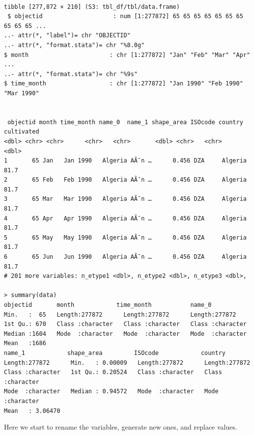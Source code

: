 \documentclass[12pt,letterpaper]{article}
\begin{document}
	
\begin{verbatim}

tibble [277,872 × 210] (S3: tbl_df/tbl/data.frame)
 $ objectid                    : num [1:277872] 65 65 65 65 65 65 65 65 65 65 ...
..- attr(*, "label")= chr "OBJECTID"
..- attr(*, "format.stata")= chr "%8.0g"
$ month                       : chr [1:277872] "Jan" "Feb" "Mar" "Apr" ...
..- attr(*, "format.stata")= chr "%9s"
$ time_month                  : chr [1:277872] "Jan 1990" "Feb 1990" "Mar 1990" 


 objectid month time_month name_0  name_1 shape_area ISOcode country cultivated
<dbl> <chr> <chr>      <chr>   <chr>       <dbl> <chr>   <chr>        <dbl>
1       65 Jan   Jan 1990   Algeria AÃ¯n …      0.456 DZA     Algeria       81.7
2       65 Feb   Feb 1990   Algeria AÃ¯n …      0.456 DZA     Algeria       81.7
3       65 Mar   Mar 1990   Algeria AÃ¯n …      0.456 DZA     Algeria       81.7
4       65 Apr   Apr 1990   Algeria AÃ¯n …      0.456 DZA     Algeria       81.7
5       65 May   May 1990   Algeria AÃ¯n …      0.456 DZA     Algeria       81.7
6       65 Jun   Jun 1990   Algeria AÃ¯n …      0.456 DZA     Algeria       81.7
# 201 more variables: n_etype1 <dbl>, n_etype2 <dbl>, n_etype3 <dbl>,

> summary(data)
objectid       month            time_month           name_0         
Min.   :  65   Length:277872      Length:277872      Length:277872     
1st Qu.: 670   Class :character   Class :character   Class :character  
Median :1604   Mode  :character   Mode  :character   Mode  :character  
Mean   :1686                                                           
name_1            shape_area         ISOcode            country         
Length:277872      Min.   : 0.00009   Length:277872      Length:277872     
Class :character   1st Qu.: 0.20524   Class :character   Class :character  
Mode  :character   Median : 0.94572   Mode  :character   Mode  :character  
Mean   : 3.06470                             
\end{verbatim}	

Here we start to rename the variables, generate new ones, and replace values.
\end{document}

